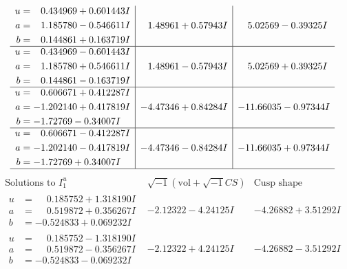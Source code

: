 \documentclass[1p]{elsarticle_modified}
\theoremstyle{definition}
\newcommand{\I}{\sqrt{-1}}
\begin{document}
$$\begin{array}{c|c|c}
\begin{aligned}
u &= \phantom{-}0.434969 + 0.601443 I \\
a &= \phantom{-}1.185780 - 0.546611 I \\
b &= \phantom{-}0.144861 + 0.163719 I\end{aligned}
 & \phantom{-}1.48961 + 0.57943 I & \phantom{-}5.02569 - 0.39325 I \\ \hline\begin{aligned}
u &= \phantom{-}0.434969 - 0.601443 I \\
a &= \phantom{-}1.185780 + 0.546611 I \\
b &= \phantom{-}0.144861 - 0.163719 I\end{aligned}
 & \phantom{-}1.48961 - 0.57943 I & \phantom{-}5.02569 + 0.39325 I \\ \hline\begin{aligned}
u &= \phantom{-}0.606671 + 0.412287 I \\
a &= -1.202140 + 0.417819 I \\
b &= -1.72769 - 0.34007 I\end{aligned}
 & -4.47346 + 0.84284 I & -11.66035 - 0.97344 I \\ \hline\begin{aligned}
u &= \phantom{-}0.606671 - 0.412287 I \\
a &= -1.202140 - 0.417819 I \\
b &= -1.72769 + 0.34007 I\end{aligned}
 & -4.47346 - 0.84284 I & -11.66035 + 0.97344 I\\
 \hline 
 \end{array}$$\newpage$$\begin{array}{c|c|c}  
\text{Solutions to }I^u_{1}& \I (\text{vol} + \sqrt{-1}CS) & \text{Cusp shape}\\
 \hline 
\begin{aligned}
u &= \phantom{-}0.185752 + 1.318190 I \\
a &= \phantom{-}0.519872 + 0.356267 I \\
b &= -0.524833 + 0.069232 I\end{aligned}
 & -2.12322 - 4.24125 I & -4.26882 + 3.51292 I \\ \hline\begin{aligned}
u &= \phantom{-}0.185752 - 1.318190 I \\
a &= \phantom{-}0.519872 - 0.356267 I \\
b &= -0.524833 - 0.069232 I\end{aligned}
 & -2.12322 + 4.24125 I & -4.26882 - 3.51292 I \\ \hline\begin{aligned}

\end{aligned}
\end{array}$$
\end{document}
